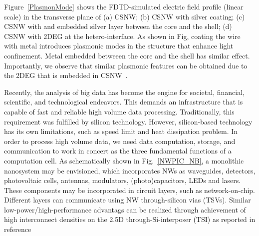 Figure~\ref{PlasmonMode} shows the FDTD-simulated electric field profile (linear scale) in the
transverse plane of (a) CSNW; (b) CSNW with silver coating; (c) CSNW with and
embedded silver layer between the core and the shell; (d) CSNW with 2DEG at the
hetero-interface. As shown in Fig, coating the wire with metal introduces
plasmonic modes in the structure that enhance light confinement. Metal embedded
betweeen the core and the shell has similar effect. Importantly, we observe
that similar plasmonic features can be obtained due to the 2DEG that is
embedded in CSNW~\cite{montazeri2016plasmonic}.

Recently, the analysis of big data has become the engine for societal,
financial, scientific, and technological endeavors. This demands an
infrastructure that is capable of fast and reliable high volume data
processing. Traditionally, this requirement was fulfilled by silicon
technology. However, silicon-based technology has its own limitations, such as
speed limit and heat dissipation problem. In order to process high volume data,
we need data computation, storage, and communication to work in concert as the
three fundamental functions of a computation cell. As schematically shown in
Fig.~\ref{NWPIC_NB}, a monolithic nanosystem may be envisioned, which
incorporates NWs as waveguides, detectors, photovoltaic cells, antennas,
modulators, (photo)capacitors, LEDs and lasers. These components may be
incorporated in circuit layers, such as network-on-chip. Different layers can
communicate using NW through-silicon vias (TSVs). Similar
low-power/high-performance advantags can be realized through achievement of
high interconnect densities on the 2.5D through-Si-interposer (TSI) as reported
in reference~\cite{Zhang:2015ec} 

